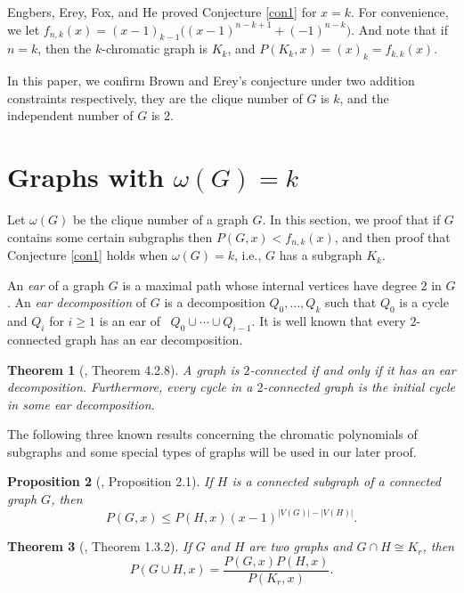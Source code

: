 \documentclass[12pt]{article}
\newtheorem{theorem}{Theorem}[section]
\newtheorem{proposition}[theorem]{Proposition}
\theoremstyle{definition}
\begin{document}
Engbers, Erey, Fox, and He \cite{EEFH21} proved Conjecture \ref{con1} for $x=k$. For convenience, we let $f_{n,k}(x)=(x-1)_{k-1}\big((x-1)^{n-k+1}+(-1)^{n-k}\big)$. And note that if $n=k$, then the $k$-chromatic graph is $K_k$, and $P(K_k, x)=(x)_k=f_{k,k}(x)$.

In this paper, we confirm Brown and Erey's conjecture under two addition constraints respectively, they are the clique number of $G$ is $k$, and the independent number of $G$ is $2$.


\section{Graphs with $\omega(G)=k$}

Let $\omega(G)$ be the clique number of a graph $G$. In this section, we proof that if $G$ contains some certain subgraphs then $P(G,x)<f_{n,k}(x)$, and then proof that Conjecture \ref{con1} holds when $\omega(G)=k$, i.e., $G$ has a subgraph $K_k$.

An {\it ear} of a graph $G$ is a maximal path whose internal vertices have degree $2$ in $G$. An {\it ear decomposition} of $G$ is a decomposition $Q_0,\ldots,Q_k$ such that $Q_0$ is a cycle and $Q_i$ for $i\geq 1$ is an ear of \ $Q_0\cup\cdots \cup Q_{i-1}$. It is well known that every $2$-connected graph has an ear decomposition.

\begin{theorem}[\cite{West01}, Theorem 4.2.8]\label{ear} A graph is $2$-connected if and only if it has an ear decomposition. Furthermore, every cycle in a $2$-connected graph is the initial cycle in some ear decomposition.
\end{theorem}



The following three known results concerning the chromatic polynomials of subgraphs and some special types of graphs will be used in our later proof.

\begin{proposition}[\cite{Erey181}, Proposition 2.1] \label{sub1} If $H$ is a connected subgraph of a connected graph $G$, then
$$P(G,x)\leq P(H,x)(x-1)^{|V(G)|-|V(H)|}.$$
\end{proposition}

\begin{theorem}[\cite{DKT05}, Theorem 1.3.2]\label{kglue} If $G$ and $H$ are two graphs and $G\cap H\cong K_r$, then
$$P(G\cup H, x)=\frac{P(G,x)P(H,x)}{P(K_r,x)}.$$\end{theorem}
\end{document}
